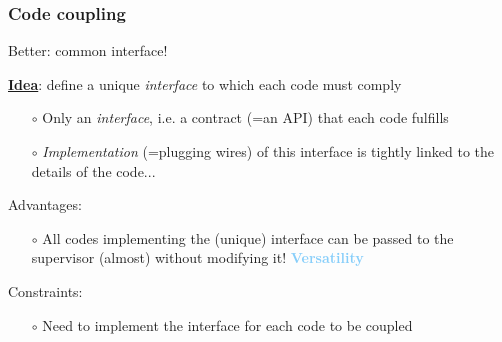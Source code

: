\documentclass[10pt, hyperref={unicode=true,pdfusetitle, bookmarks=true,bookmarksnumbered=false,bookmarksopen=false, breaklinks=false,pdfborder={0 0 1},backref=true,colorlinks=true,linkcolor=darkblue,pageanchor, urlcolor=darkblue}]{beamer}
\begin{document}
\begin{frame}
\frametitle{Code coupling}
\begin{block}{Better: common interface!}


\underline{\textbf{Idea}}: define a unique \textit{interface} to which each code must comply
    \begin{itemize}
    \item [$\circ$] Only an \textit{interface}, i.e. a contract (=an API) that each code fulfills
    \item [$\circ$] \textit{Implementation} (=plugging wires) of this interface is tightly linked to the details of the code...
    \end{itemize}
Advantages:
    \begin{itemize}
    \item [$\circ$] All codes implementing the (unique) interface can be passed to the supervisor (almost) without modifying it! \textbf{\textcolor{LightSkyBlue}{Versatility}}
    \end{itemize}
Constraints:
    \begin{itemize}
    \item [$\circ$] Need to implement the interface for each code to be coupled
    \end{itemize}


\end{block}
\end{frame}
\end{document}
